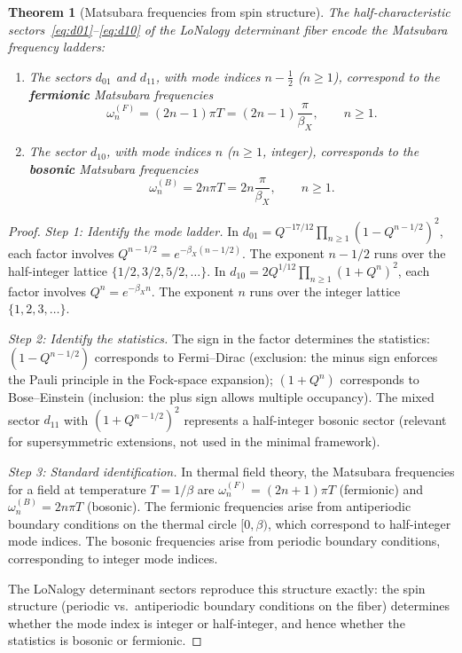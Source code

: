 \documentclass[12pt]{article}
\theoremstyle{plain}
\newtheorem{theorem}{Theorem}[section]
\theoremstyle{definition}
\numberwithin{equation}{section}
\begin{document}
\begin{theorem}[Matsubara frequencies from spin structure]\label{thm:matsubara}
The half-characteristic sectors~\eqref{eq:d01}--\eqref{eq:d10} of the
LoNalogy determinant fiber encode the Matsubara frequency ladders:
\begin{enumerate}[label=(\roman*)]
\item The sectors $d_{01}$ and $d_{11}$, with mode indices $n-\frac{1}{2}$
($n\geq 1$), correspond to the \textbf{fermionic} Matsubara frequencies
\begin{equation}
\omega_n^{(F)} = (2n-1)\pi T = (2n-1)\frac{\pi}{\beta_X},
\qquad n\geq 1.
\end{equation}
\item The sector $d_{10}$, with mode indices $n$ ($n\geq 1$, integer),
corresponds to the \textbf{bosonic} Matsubara frequencies
\begin{equation}
\omega_n^{(B)} = 2n\pi T = 2n\frac{\pi}{\beta_X},
\qquad n\geq 1.
\end{equation}
\end{enumerate}
\end{theorem}

\begin{proof}
\emph{Step 1: Identify the mode ladder.}
In $d_{01}=Q^{-17/12}\prod_{n\geq1}(1-Q^{n-1/2})^2$, each factor
involves $Q^{n-1/2}=e^{-\beta_X(n-1/2)}$.  The exponent $n-1/2$
runs over the half-integer lattice $\{1/2,3/2,5/2,\ldots\}$.
In $d_{10}=2Q^{1/12}\prod_{n\geq1}(1+Q^n)^2$, each factor involves
$Q^n=e^{-\beta_X n}$.  The exponent $n$ runs over the integer lattice
$\{1,2,3,\ldots\}$.

\emph{Step 2: Identify the statistics.}
The sign in the factor determines the statistics:
$(1-Q^{n-1/2})$ corresponds to Fermi--Dirac (exclusion: the minus sign
enforces the Pauli principle in the Fock-space expansion);
$(1+Q^n)$ corresponds to Bose--Einstein (inclusion: the plus sign allows
multiple occupancy).  The mixed sector $d_{11}$ with $(1+Q^{n-1/2})^2$
represents a half-integer bosonic sector (relevant for supersymmetric
extensions, not used in the minimal framework).

\emph{Step 3: Standard identification.}
In thermal field theory, the Matsubara frequencies for a field at
temperature $T=1/\beta$ are
$\omega_n^{(F)}=(2n+1)\pi T$ (fermionic) and
$\omega_n^{(B)}=2n\pi T$ (bosonic).  The fermionic frequencies arise
from antiperiodic boundary conditions on the thermal circle
$[0,\beta)$, which correspond to half-integer mode indices.
The bosonic frequencies arise from periodic boundary conditions,
corresponding to integer mode indices.

The LoNalogy determinant sectors reproduce this structure exactly:
the spin structure (periodic vs.\ antiperiodic boundary conditions on
the fiber) determines whether the mode index is integer or half-integer,
and hence whether the statistics is bosonic or fermionic.
\end{proof}
\end{document}
